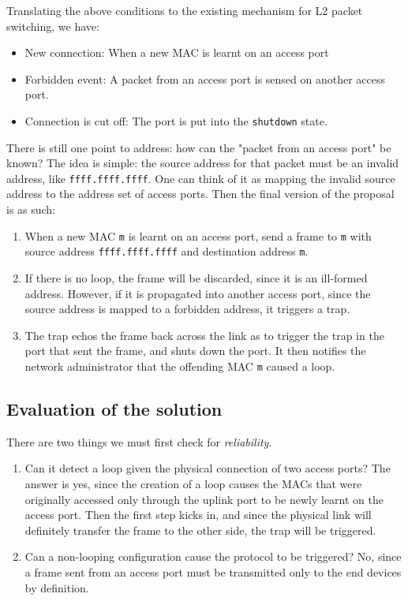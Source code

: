 \documentclass{article}
\begin{document}
Translating the above conditions to the existing mechanism for L2 packet switching, we have:
\begin{itemize}
    \item New connection: When a new MAC is learnt on an access port
    \item Forbidden event: A packet from an access port is sensed on another access port.
    \item Connection is cut off: The port is put into the \texttt{shutdown} state.
\end{itemize}

There is still one point to address: how can the "packet from an access port" be known? The idea is simple: the source address for that packet must be an invalid address, like \texttt{ffff.ffff.ffff}. One can think of it as mapping the invalid source address to the address set of access ports. Then the final version of the proposal is as such:
\begin{enumerate}
    \item When a new MAC \texttt{m} is learnt on an access port, send a frame to \texttt{m} with source address \texttt{ffff.ffff.ffff} and destination address \texttt{m}.
    \item If there is no loop, the frame will be discarded, since it is an ill-formed address. However, if it is propagated into another access port, since the source address is mapped to a forbidden address, it triggers a trap.
    \item The trap echos the frame back across the link as to trigger the trap in the port that sent the frame, and shuts down the port. It then notifies the network administrator that the offending MAC \texttt{m} caused a loop.
\end{enumerate}

\subsection{Evaluation of the solution}

There are two things we must first check for \textit{reliability}.

\begin{enumerate}
    \item Can it detect a loop given the physical connection of two access ports? The answer is yes, since the creation of a loop causes the MACs that were originally accessed only through the uplink port to be newly learnt on the access port. Then the first step kicks in, and since the physical link will definitely transfer the frame to the other side, the trap will be triggered.
    \item Can a non-looping configuration cause the protocol to be triggered? No, since a frame sent from an access port must be transmitted only to the end devices by definition.
\end{enumerate}
\end{document}
